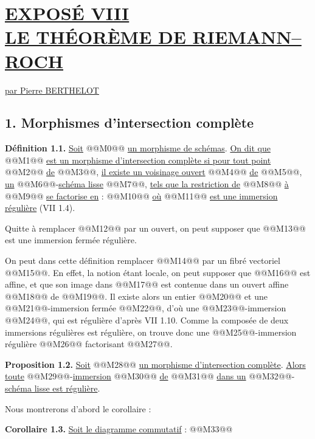 
\section*{\underline{EXPOSÉ VIII}\\[3pt] \underline{\underline{LE THÉORÈME DE RIEMANN--ROCH}}}
\begin{center}
\underline{par Pierre BERTHELOT}
\end{center}

\subsection*{1. Morphismes d'intersection complète}

\textbf{Définition 1.1.} \uline{Soit} @@M0@@ \uline{un morphisme de schémas}. \uline{On dit que} @@M1@@ \uline{est un morphisme d'intersection complète si pour tout point} @@M2@@ \uline{de} @@M3@@, \uline{il existe un voisinage ouvert} @@M4@@ \uline{de} @@M5@@, \uline{un} @@M6@@-\uline{schéma lisse} @@M7@@, \uline{tels que la restriction de} @@M8@@ \uline{à} @@M9@@ \uline{se factorise en} :
@@M10@@
\uline{où} @@M11@@ \uline{est une immersion régulière} (VII 1.4).

Quitte à remplacer @@M12@@ par un ouvert, on peut supposer que @@M13@@ est une immersion fermée régulière.

On peut dans cette définition remplacer @@M14@@ par un fibré vectoriel @@M15@@. En effet, la notion étant locale, on peut supposer que @@M16@@ est affine, et que son image dans @@M17@@ est contenue dans un ouvert affine @@M18@@ de @@M19@@. Il existe alors un entier @@M20@@ et une @@M21@@-immersion fermée @@M22@@, d'où une @@M23@@-immersion @@M24@@, qui est régulière d'après VII 1.10. Comme la composée de deux immersions régulières est régulière, on trouve donc une @@M25@@-immersion régulière @@M26@@ factorisant @@M27@@.

\textbf{Proposition 1.2.} \uline{Soit} @@M28@@ \uline{un morphisme d'intersection complète}. \uline{Alors toute} @@M29@@-\uline{immersion} @@M30@@ \uline{de} @@M31@@ \uline{dans un} @@M32@@-\uline{schéma lisse est régulière}.

Nous montrerons d'abord le corollaire :

\textbf{Corollaire 1.3.} \uline{Soit le diagramme commutatif} :
@@M33@@
